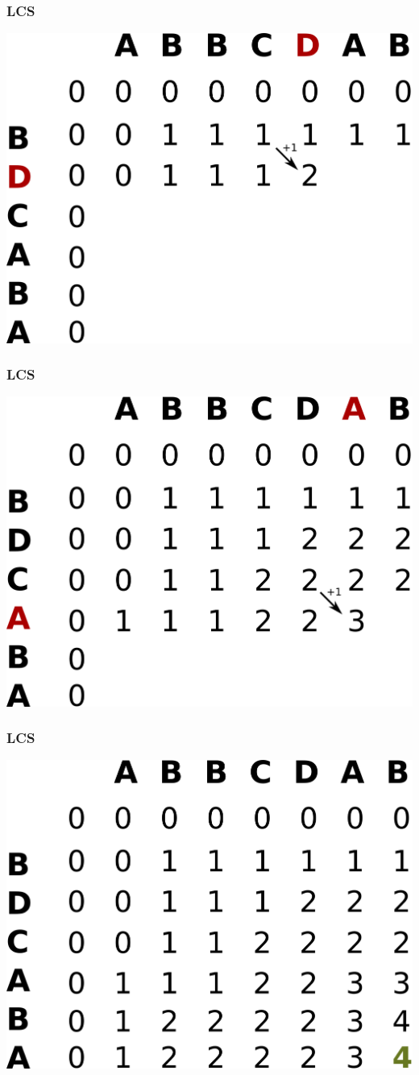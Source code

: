 \documentclass[12pt,pdf,hyperref={unicode}]{beamer}
\begin{document}
\begin{frame}[fragile]
\frametitle{LCS} 
\begin{center}
\includegraphics[width=0.75\linewidth]{images/lcstable6.png}
\end{center}
\end{frame}

\begin{frame}[fragile]
\frametitle{LCS} 
\begin{center}
\includegraphics[width=0.75\linewidth]{images/lcstable7.png}
\end{center}
\end{frame}

\begin{frame}[fragile]
\frametitle{LCS} 
\begin{center}
\includegraphics[width=0.75\linewidth]{images/lcstable8.png}
\end{center}
\end{frame}
\end{document}
